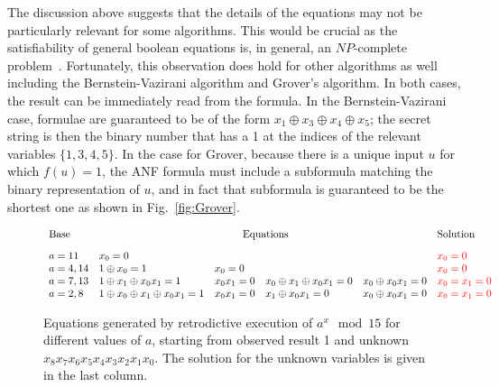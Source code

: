 \documentclass[sigplan]{acmart}
\newcommand{\red}[1]{{\color{red}{#1}}}
\begin{document}
The discussion above suggests that the details of the equations may
not be particularly relevant for some algorithms. This would be
crucial as the satisfiability of general boolean equations is, in
general, an $\mathit{NP}$-complete
problem~\cite{4640789,Karp1972,10.1145/800157.805047}. Fortunately,
this observation does hold for other algorithms as well including the
Bernstein-Vazirani algorithm and Grover's algorithm. In both cases,
the result can be immediately read from the formula. In the
Bernstein-Vazirani case, formulae are guaranteed to be of the form
$x_1 \oplus x_3 \oplus x_4 \oplus x_5$; the secret string is then the
binary number that has a 1 at the indices of the relevant variables
$\{ 1,3,4,5 \}$. In the case for Grover, because there is a unique
input $u$ for which $f(u) = 1$, the ANF formula must include a
subformula matching the binary representation of $u$, and in fact that
subformula is guaranteed to be the shortest one as shown in
Fig.~\ref{fig:Grover}.

\begin{figure*}
\[\begin{array}{l@{\quad}lllll}
\textrm{Base} & \multicolumn{4}{c}{\textrm{Equations}} & \textrm{Solution} \\[2ex]
a=11 & x_0 = 0 &&&& \red{x_0 = 0} \\
a=4,14 & 1 \oplus x_0 = 1 & x_0 = 0 &&
  & \red{x_0 = 0} \\
a=7,13 & 1 \oplus x_1 \oplus x_0x_1 = 1 & x_0x_1 = 0 & x_0 \oplus x_1 \oplus x_0x_1 = 0 &  x_0 \oplus x_0x_1 = 0 & \red{x_0=x_1=0} \\
a=2,8 & 1 \oplus x_0 \oplus x_1 \oplus x_0x_1 = 1 & x_0x_1 = 0 & x_1 \oplus x_0x_1 = 0 & x_0 \oplus x_0x_1 = 0  & \red{x_0=x_1=0}
\end{array}\]
\caption{\label{fig:shor-eqs}Equations generated by retrodictive
  execution of $a^x \mod{15}$ for different values of $a$, starting
  from observed result 1 and unknown
  $x_8x_7x_6x_5x_4x_3x_2x_1x_0$. The solution for the unknown
  variables is given in the last column.}
\end{figure*}
\end{document}
